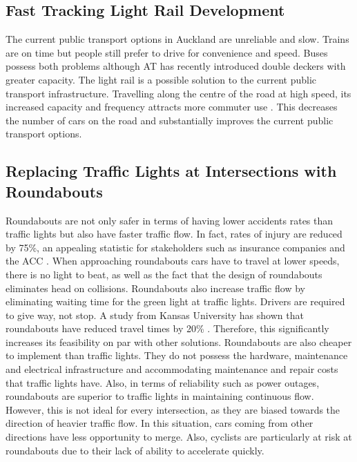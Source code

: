 \documentclass[twoside, a4paper, 11pt]{article}
\begin{document}
\subsection{Fast Tracking Light Rail Development}
The current public transport options in Auckland are unreliable and slow. Trains are on time but people still prefer to drive for convenience and speed. Buses possess both problems although AT has recently introduced double deckers with greater capacity. The light rail is a possible solution to the current public transport infrastructure. Travelling along the centre of the road at high speed, its increased capacity and frequency attracts more commuter use \citep{AT16_2}. This decreases the number of cars on the road and substantially improves the current public transport options.

\subsection{Replacing Traffic Lights at Intersections with Roundabouts}
Roundabouts are not only safer in terms of having lower accidents rates than traffic lights but also have faster traffic flow. In fact, rates of injury are reduced by 75\%, an appealing statistic for stakeholders such as insurance companies and the ACC \citep{wsdtND}. When approaching roundabouts cars have to travel at lower speeds, there is no light to beat, as well as the fact that the design of roundabouts eliminates head on collisions. Roundabouts also increase traffic flow by eliminating waiting time for the green light at traffic lights. Drivers are required to give way, not stop. A study from Kansas University has shown that roundabouts have reduced travel times by 20\% \citep{russeletal2002}. Therefore, this significantly increases its feasibility on par with other solutions. Roundabouts are also cheaper to implement than traffic lights. They do not possess the hardware, maintenance and electrical infrastructure and accommodating maintenance and repair costs that traffic lights have. Also, in terms of reliability such as power outages, roundabouts are superior to traffic lights in maintaining continuous flow. However, this is not ideal for every intersection, as they are biased towards the direction of heavier traffic flow. In this situation, cars coming from other directions have less opportunity to merge. Also, cyclists are particularly at risk at roundabouts due to their lack of ability to accelerate quickly. 
 
\end{document}
